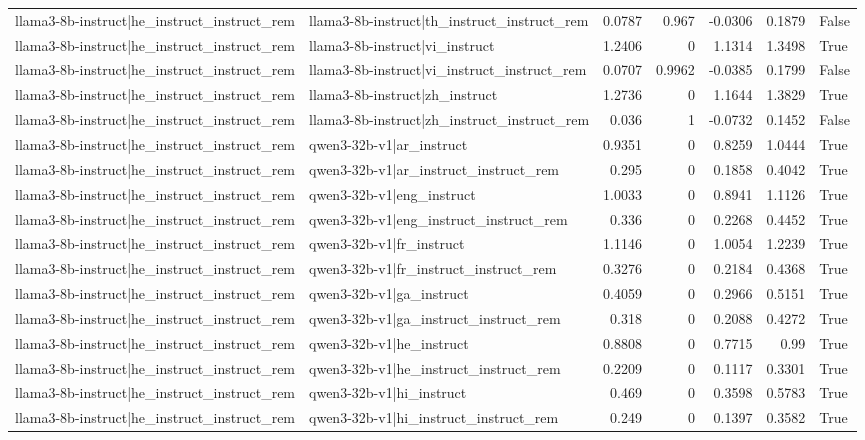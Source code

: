 \begin{table}
\begin{tabular}{l l r r r r l}
llama3-8b-instruct|he_instruct_instruct_rem & llama3-8b-instruct|th_instruct_instruct_rem & 0.0787 & 0.967 & -0.0306 & 0.1879 & False \\
llama3-8b-instruct|he_instruct_instruct_rem & llama3-8b-instruct|vi_instruct & 1.2406 & 0 & 1.1314 & 1.3498 & True \\
llama3-8b-instruct|he_instruct_instruct_rem & llama3-8b-instruct|vi_instruct_instruct_rem & 0.0707 & 0.9962 & -0.0385 & 0.1799 & False \\
llama3-8b-instruct|he_instruct_instruct_rem & llama3-8b-instruct|zh_instruct & 1.2736 & 0 & 1.1644 & 1.3829 & True \\
llama3-8b-instruct|he_instruct_instruct_rem & llama3-8b-instruct|zh_instruct_instruct_rem & 0.036 & 1 & -0.0732 & 0.1452 & False \\
llama3-8b-instruct|he_instruct_instruct_rem & qwen3-32b-v1|ar_instruct & 0.9351 & 0 & 0.8259 & 1.0444 & True \\
llama3-8b-instruct|he_instruct_instruct_rem & qwen3-32b-v1|ar_instruct_instruct_rem & 0.295 & 0 & 0.1858 & 0.4042 & True \\
llama3-8b-instruct|he_instruct_instruct_rem & qwen3-32b-v1|eng_instruct & 1.0033 & 0 & 0.8941 & 1.1126 & True \\
llama3-8b-instruct|he_instruct_instruct_rem & qwen3-32b-v1|eng_instruct_instruct_rem & 0.336 & 0 & 0.2268 & 0.4452 & True \\
llama3-8b-instruct|he_instruct_instruct_rem & qwen3-32b-v1|fr_instruct & 1.1146 & 0 & 1.0054 & 1.2239 & True \\
llama3-8b-instruct|he_instruct_instruct_rem & qwen3-32b-v1|fr_instruct_instruct_rem & 0.3276 & 0 & 0.2184 & 0.4368 & True \\
llama3-8b-instruct|he_instruct_instruct_rem & qwen3-32b-v1|ga_instruct & 0.4059 & 0 & 0.2966 & 0.5151 & True \\
llama3-8b-instruct|he_instruct_instruct_rem & qwen3-32b-v1|ga_instruct_instruct_rem & 0.318 & 0 & 0.2088 & 0.4272 & True \\
llama3-8b-instruct|he_instruct_instruct_rem & qwen3-32b-v1|he_instruct & 0.8808 & 0 & 0.7715 & 0.99 & True \\
llama3-8b-instruct|he_instruct_instruct_rem & qwen3-32b-v1|he_instruct_instruct_rem & 0.2209 & 0 & 0.1117 & 0.3301 & True \\
llama3-8b-instruct|he_instruct_instruct_rem & qwen3-32b-v1|hi_instruct & 0.469 & 0 & 0.3598 & 0.5783 & True \\
llama3-8b-instruct|he_instruct_instruct_rem & qwen3-32b-v1|hi_instruct_instruct_rem & 0.249 & 0 & 0.1397 & 0.3582 & True \\

\end{tabular}
\end{table}
